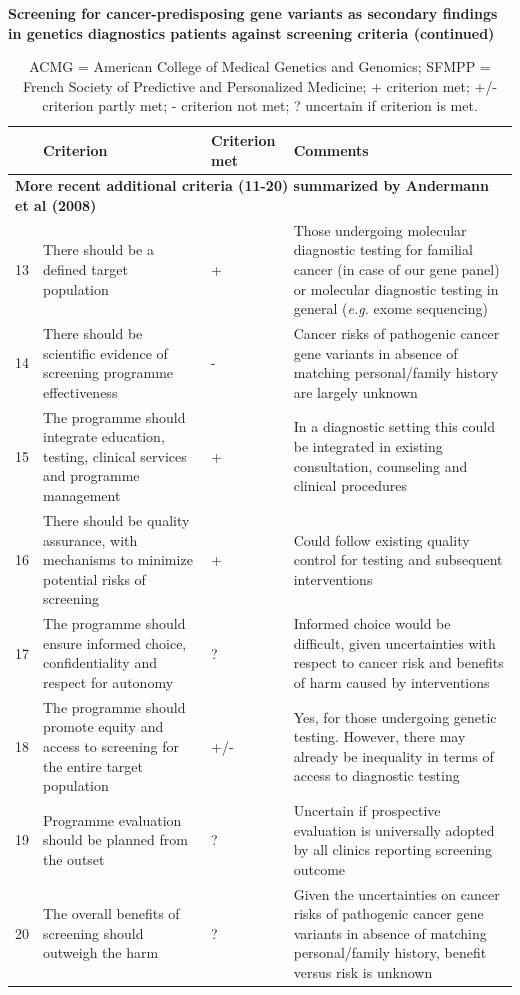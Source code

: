 \begin{table}
	\footnotesize
	\caption*{\label{table:summary3}\textbf{Screening for cancer-predisposing gene variants as secondary findings in genetics diagnostics patients against screening criteria (continued)}}
	\begin{tabular}{ p{0.5cm} p{5.5cm} p{2cm} p{7cm} }
		& \footnotesize{\textbf{Criterion}} & \footnotesize{\textbf{Criterion met}} & \footnotesize{\textbf{Comments}} \\
		\hline 
		\multicolumn{4}{l}{\textbf{More recent additional criteria (11-20) summarized by Andermann et al (2008) \cite{Andermann_2008}}} \\
		\hline 
		
		13 & There should be a defined target population & + & Those undergoing molecular diagnostic testing for familial cancer (in case of our gene panel) or molecular diagnostic testing in general (\textsl{e.g.} exome sequencing) \\
		14 & There should be scientific evidence of screening programme effectiveness & -  & Cancer risks of pathogenic cancer gene variants in absence of matching personal/family history are largely unknown \\
		15 & The programme should integrate education, testing, clinical services and programme management & + & In a diagnostic setting this could be integrated in existing consultation, counseling and clinical procedures \\
		16 & There should be quality assurance, with mechanisms to minimize potential risks of screening & + & Could follow existing quality control for testing and subsequent interventions \\
		17 & The programme should ensure informed choice, confidentiality and respect for autonomy & ? & Informed choice would be difficult, given uncertainties with respect to cancer risk and benefits of harm caused by interventions \\
		18 & The programme should promote equity and access to screening for the entire target population & +/- & Yes, for those undergoing genetic testing. However, there may already be inequality in terms of access to diagnostic testing \\
		19 & Programme evaluation should be planned from the outset & ? & Uncertain if prospective evaluation is universally adopted by all clinics reporting screening outcome \\
		20 & The overall benefits of screening should outweigh the harm & ? & Given the uncertainties on cancer risks of pathogenic cancer gene variants in absence of matching personal/family history, benefit versus risk is unknown \\
		\hline
	\end{tabular}
	\caption*{ACMG = American College of Medical Genetics and Genomics; SFMPP = French Society of Predictive and Personalized Medicine; + criterion met; +/- criterion partly met; - criterion not met; ? uncertain if criterion is met.}
\end{table}


